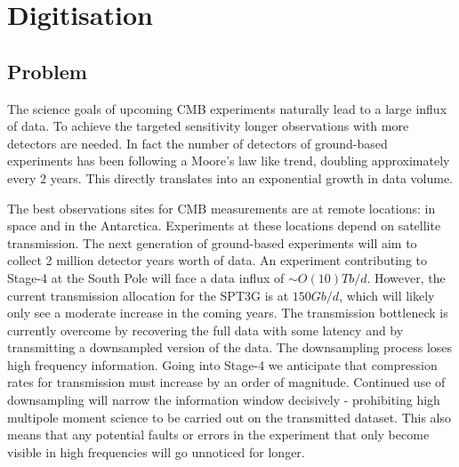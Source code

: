 \documentclass[apj]{emulateapj}
\begin{document}





\section{Digitisation}
\label{sec:dig}

\subsection{Problem}
\label{subsec:problem}


The science goals of upcoming CMB experiments naturally lead to a large influx of data. To achieve the targeted sensitivity longer observations with more detectors are needed. In fact the number of detectors of ground-based experiments has been following a Moore's law like trend, doubling approximately every 2 years. This directly translates into an exponential growth in data volume.

The best observations sites for CMB measurements are at remote locations: in space and in the Antarctica. Experiments at these locations depend on satellite transmission. The next generation of ground-based experiments will aim to collect 2 million detector years worth of data. An experiment contributing to Stage-4 at the South Pole will face a data influx of $\sim O(10)Tb/d$. However, the current transmission allocation for the SPT3G is at $150Gb/d$, which will likely only see a moderate increase in the coming years. The transmission bottleneck is currently overcome by recovering the full data with some latency and by transmitting a downsampled version of the data. The downsampling process loses high frequency information. Going into Stage-4 we anticipate that compression rates for transmission must increase by an order of magnitude. Continued use of downsampling will narrow the information window decisively - prohibiting high multipole moment science to be carried out on the transmitted dataset. This also means that any potential faults or errors in the experiment that only become visible in high frequencies will go unnoticed for longer.
\end{document}
